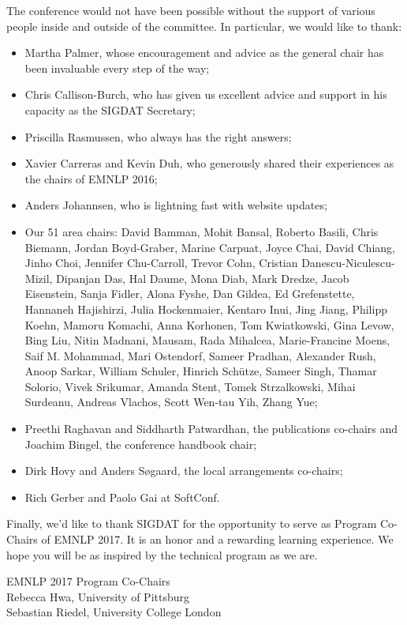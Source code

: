 The conference would not have been possible without the support of various people inside and outside of the committee. In particular, we would like to thank:

\begin{itemize}
 
\item Martha Palmer, whose encouragement and advice as the general chair has been invaluable every step of the way;
\item Chris Callison-Burch, who has given us excellent advice and support in his capacity as the SIGDAT Secretary;
\item Priscilla Rasmussen, who always has the right answers;
\item Xavier Carreras and Kevin Duh, who generously shared their experiences as the chairs of EMNLP 2016; 
\item Anders Johannsen, who is lightning fast with website updates;
\item Our 51 area chairs:  David Bamman, Mohit Bansal, Roberto Basili, Chris Biemann, Jordan Boyd-Graber, Marine Carpuat, Joyce Chai, David Chiang, Jinho Choi, Jennifer Chu-Carroll, Trevor Cohn, Cristian Danescu-Niculescu-Mizil, Dipanjan Das, Hal Daume, Mona Diab, Mark Dredze, Jacob Eisenstein, Sanja Fidler, Alona Fyshe, Dan Gildea, Ed Grefenstette, Hannaneh Hajishirzi, Julia Hockenmaier, Kentaro Inui, Jing Jiang, Philipp Koehn, Mamoru Komachi, Anna Korhonen, Tom Kwiatkowski, Gina Levow, Bing Liu, Nitin Madnani, Mausam, Rada Mihalcea, Marie-Francine Moens, Saif M. Mohammad, Mari Ostendorf, Sameer Pradhan, Alexander Rush, Anoop Sarkar, William Schuler, Hinrich Schütze, Sameer Singh, Thamar Solorio, Vivek Srikumar, Amanda Stent, Tomek Strzalkowski, Mihai Surdeanu, Andreas Vlachos, Scott Wen-tau Yih, Zhang Yue;
\item Preethi Raghavan and Siddharth Patwardhan, the publications co-chairs and Joachim Bingel, the conference handbook chair;
\item Dirk Hovy and Anders Søgaard, the local arrangements co-chairs;
\item Rich Gerber and Paolo Gai at SoftConf.
 
\end{itemize}
Finally, we’d like to thank SIGDAT for the opportunity to serve as Program Co-Chairs of EMNLP 2017. It is an honor and a rewarding learning experience. We hope you will be as inspired by the technical program as we are. 

\vspace{3em}

\noindent EMNLP 2017 Program Co-Chairs \\
Rebecca Hwa, University of Pittsburg\\
Sebastian Riedel, University College London
